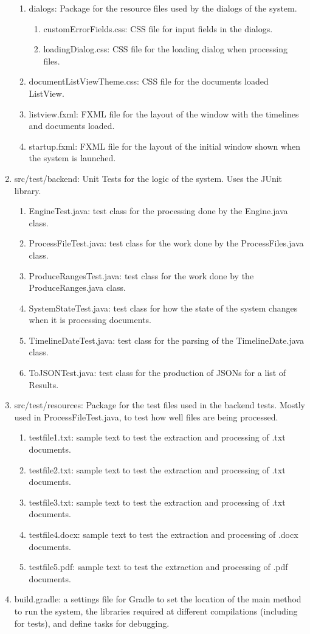 \begin{enumerate}
\begin{enumerate}
		\item dialogs: Package for the resource files used by the dialogs of the system.
		\begin{enumerate}
			\item customErrorFields.css: CSS file for input fields in the dialogs.
			\item loadingDialog.css: CSS file for the loading dialog when processing files.
		\end{enumerate}
		\item documentListViewTheme.css: CSS file for the documents loaded ListView.
		\item listview.fxml: FXML file for the layout of the window with the timelines and documents loaded.
		\item startup.fxml: FXML file for the layout of the initial window shown when the system is launched.
	\end{enumerate}
	\item src/test/backend: Unit Tests for the logic of the system. Uses the JUnit library.
	\begin{enumerate}
		\item EngineTest.java: test class for the processing done by the Engine.java class.
		\item ProcessFileTest.java: test class for the work done by the ProcessFiles.java class.
		\item ProduceRangesTest.java: test class for the work done by the ProduceRanges.java class.
		\item SystemStateTest.java: test class for how the state of the system changes when it is processing documents.
		\item TimelineDateTest.java: test class for the parsing of the TimelineDate.java class.
		\item ToJSONTest.java: test class for the production of JSONs for a list of Results.
	\end{enumerate}
	\item src/test/resources: Package for the test files used in the backend tests. Mostly used in ProcessFileTest.java, to test how well files are being processed.
	\begin{enumerate}
		\item testfile1.txt: sample text to test the extraction and processing of .txt documents. 
		\item testfile2.txt: sample text to test the extraction and processing of .txt documents. 
		\item testfile3.txt: sample text to test the extraction and processing of .txt documents. 
		\item testfile4.docx: sample text to test the extraction and processing of .docx documents. 
		\item testfile5.pdf: sample text to test the extraction and processing of .pdf documents. 
	\end{enumerate}
	\item build.gradle: a settings file for Gradle to set the location of the main method to run the system, the libraries required at different compilations (including for tests), and define tasks for debugging.
\end{enumerate}

